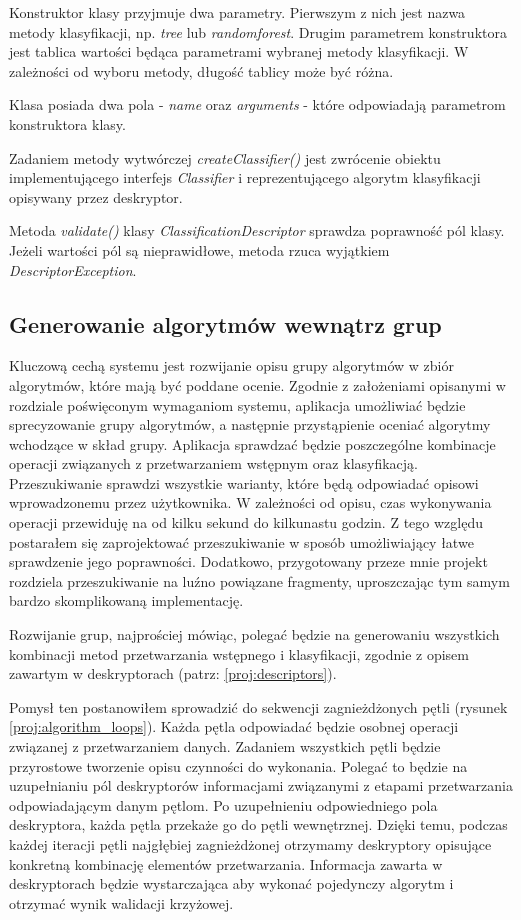 \documentclass[../thesis.tex]{subfiles}
\begin{document}
Konstruktor klasy przyjmuje dwa parametry. Pierwszym z nich jest nazwa metody klasyfikacji, np. \emph{tree} lub \emph{randomforest}. Drugim parametrem konstruktora jest tablica wartości będąca parametrami wybranej metody klasyfikacji. W zależności od wyboru metody, długość tablicy może być różna.

Klasa posiada dwa pola - \emph{name} oraz \emph{arguments} - które odpowiadają parametrom konstruktora klasy.

Zadaniem metody wytwórczej \emph{createClassifier()} jest zwrócenie obiektu implementującego interfejs \emph{Classifier} i reprezentującego algorytm klasyfikacji opisywany przez deskryptor.

Metoda \emph{validate()} klasy \emph{ClassificationDescriptor} sprawdza poprawność pól klasy. Jeżeli wartości pól są nieprawidłowe, metoda rzuca wyjątkiem \emph{DescriptorException}.

\subsection{Generowanie algorytmów wewnątrz grup}

Kluczową cechą systemu jest rozwijanie opisu grupy algorytmów w zbiór algorytmów, które mają być poddane ocenie. Zgodnie z założeniami opisanymi w rozdziale poświęconym wymaganiom systemu, aplikacja umożliwiać będzie sprecyzowanie grupy algorytmów, a następnie przystąpienie oceniać algorytmy wchodzące w skład grupy. Aplikacja sprawdzać będzie poszczególne kombinacje operacji związanych z przetwarzaniem wstępnym oraz klasyfikacją. Przeszukiwanie sprawdzi wszystkie warianty, które będą odpowiadać opisowi wprowadzonemu przez użytkownika. W zależności od opisu, czas wykonywania operacji przewiduję na od kilku sekund do kilkunastu godzin. Z tego względu postarałem się zaprojektować przeszukiwanie w sposób umożliwiający łatwe sprawdzenie jego poprawności. Dodatkowo, przygotowany przeze mnie projekt rozdziela przeszukiwanie na luźno powiązane fragmenty, uproszczając tym samym bardzo skomplikowaną implementację.

Rozwijanie grup, najprościej mówiąc, polegać będzie na generowaniu wszystkich kombinacji metod przetwarzania wstępnego i klasyfikacji, zgodnie z opisem zawartym w deskryptorach (patrz: \ref{proj:descriptors}).

Pomysł ten postanowiłem sprowadzić do sekwencji zagnieżdżonych pętli (rysunek \ref{proj:algorithm_loops}). Każda pętla odpowiadać będzie osobnej operacji związanej z przetwarzaniem danych. Zadaniem wszystkich pętli będzie przyrostowe tworzenie opisu czynności do wykonania. Polegać to będzie na uzupełnianiu pól deskryptorów informacjami związanymi z etapami przetwarzania odpowiadającym danym pętlom. Po uzupełnieniu odpowiedniego pola deskryptora, każda pętla przekaże go do pętli wewnętrznej. Dzięki temu, podczas każdej iteracji pętli najgłębiej zagnieżdżonej otrzymamy deskryptory opisujące konkretną kombinację elementów przetwarzania. Informacja zawarta w deskryptorach będzie wystarczająca aby wykonać pojedynczy algorytm i otrzymać wynik walidacji krzyżowej. 
\end{document}
